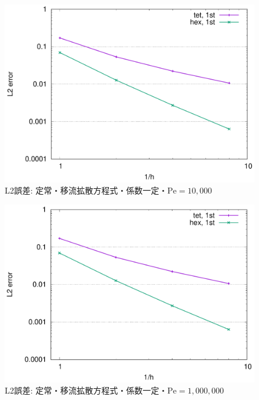 \documentclass[8pt,a4paper]{article}
\begin{document}
\begin{figure}[h!!]
	\centering
	\includegraphics[width=10.0truecm]{pics/conv_convdiff_const_pe10000.pdf}
	\caption{L2誤差: 定常・移流拡散方程式・係数一定・$\mathrm{Pe} = 10{,}000$}
	\label{fig:conv_convdiff_const_pe10000}
\end{figure}
\begin{figure}[h!!]
	\centering
	\includegraphics[width=10.0truecm]{pics/conv_convdiff_const_pe1000000.pdf}
	\caption{L2誤差: 定常・移流拡散方程式・係数一定・$\mathrm{Pe} = 1{,}000{,}000$}
	\label{fig:conv_convdiff_const_pe1000000}
\end{figure}
\end{document}
